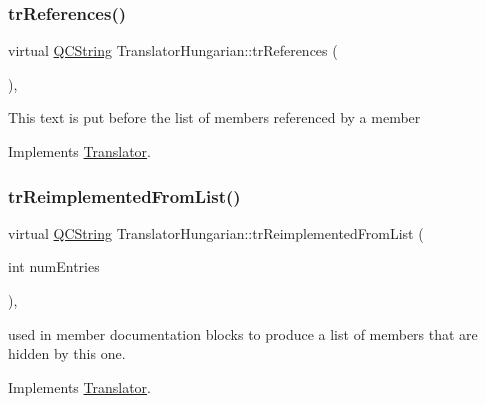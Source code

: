 \mbox{\label{class_translator_hungarian_a3b8e8265ab10b806370b32eac47034c3}} 
\subsubsection{\texorpdfstring{trReferences()}{trReferences()}}
{\footnotesize\ttfamily virtual \mbox{\hyperlink{class_q_c_string}{Q\+C\+String}} Translator\+Hungarian\+::tr\+References (\begin{DoxyParamCaption}{ }\end{DoxyParamCaption})\hspace{0.3cm}{\ttfamily [inline]}, {\ttfamily [virtual]}}

This text is put before the list of members referenced by a member 

Implements \mbox{\hyperlink{class_translator}{Translator}}.

\mbox{\label{class_translator_hungarian_a514a13e4a354df144a5d6c9792433402}} 
\subsubsection{\texorpdfstring{trReimplementedFromList()}{trReimplementedFromList()}}
{\footnotesize\ttfamily virtual \mbox{\hyperlink{class_q_c_string}{Q\+C\+String}} Translator\+Hungarian\+::tr\+Reimplemented\+From\+List (\begin{DoxyParamCaption}\item[{int}]{num\+Entries }\end{DoxyParamCaption})\hspace{0.3cm}{\ttfamily [inline]}, {\ttfamily [virtual]}}

used in member documentation blocks to produce a list of members that are hidden by this one. 

Implements \mbox{\hyperlink{class_translator}{Translator}}.

\mbox{\label{class_translator_hungarian_a367b351622eaaf0e6ce2ce08e58b95bb}} 
